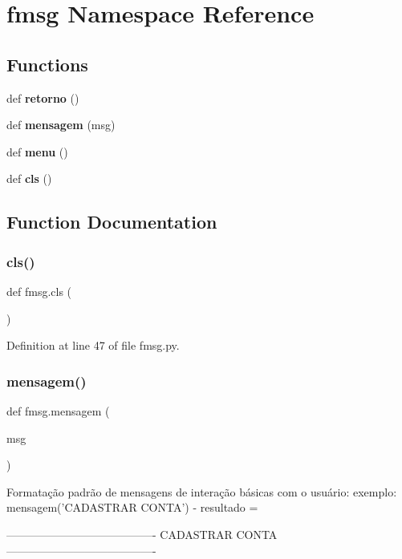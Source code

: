 \section{fmsg Namespace Reference}
\label{namespacefmsg}
\subsection*{Functions}
\begin{DoxyCompactItemize}
\item 
def \textbf{ retorno} ()
\item 
def \textbf{ mensagem} (msg)
\item 
def \textbf{ menu} ()
\item 
def \textbf{ cls} ()
\end{DoxyCompactItemize}


\subsection{Function Documentation}
\mbox{\label{namespacefmsg_a3b9d4b6d072d3f7e0e800db910de2650}} 
\subsubsection{cls()}
{\footnotesize\ttfamily def fmsg.\+cls (\begin{DoxyParamCaption}{ }\end{DoxyParamCaption})}



Definition at line 47 of file fmsg.\+py.

\mbox{\label{namespacefmsg_a3ed493877b0ce8b7acf946faf5bb04ce}} 
\subsubsection{mensagem()}
{\footnotesize\ttfamily def fmsg.\+mensagem (\begin{DoxyParamCaption}\item[{}]{msg }\end{DoxyParamCaption})}

\begin{DoxyVerb}Formatação padrão de mensagens de interação básicas com o usuário:
exemplo: mensagem('CADASTRAR CONTA') - resultado =

----------------------------------------
        CADASTRAR CONTA             
----------------------------------------
\end{DoxyVerb}
 


